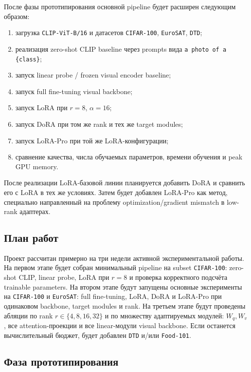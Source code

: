 \documentclass[]{scrartcl}
\begin{document}
После фазы прототипирования основной pipeline будет расширен следующим образом:
\begin{enumerate}
    \item загрузка \texttt{CLIP-ViT-B/16} и датасетов \texttt{CIFAR-100}, \texttt{EuroSAT}, \texttt{DTD};
    \item реализация zero-shot CLIP baseline через prompts вида \texttt{a photo of a \{class\}};
    \item запуск linear probe / frozen visual encoder baseline;
    \item запуск full fine-tuning visual backbone;
    \item запуск LoRA при $r=8$, $\alpha=16$;
    \item запуск DoRA при том же rank и тех же target modules;
    \item запуск LoRA-Pro при той же LoRA-конфигурации;
    \item сравнение качества, числа обучаемых параметров, времени обучения и peak GPU memory.
\end{enumerate}


После реализации LoRA-базовой линии планируется добавить DoRA и сравнить его с LoRA в тех же
условиях. Затем будет добавлен LoRA-Pro как метод, специально направленный на проблему
optimization/gradient mismatch в low-rank адаптерах.

\subsection{План работ}

Проект рассчитан примерно на три недели активной экспериментальной работы. На первом этапе будет собран минимальный pipeline на subset \texttt{CIFAR-100}: zero-shot CLIP, linear probe, LoRA при $r=8$ и проверка корректного подсчёта trainable parameters. На втором этапе будут запущены основные эксперименты на \texttt{CIFAR-100} и \texttt{EuroSAT}: full fine-tuning, LoRA, DoRA и LoRA-Pro при одинаковом backbone, target modules и rank. На третьем этапе будут проведены абляции по rank $r \in \{4,8,16,32\}$ и по множеству адаптируемых модулей: $W_q,W_v$, все attention-проекции и все linear-модули visual backbone. Если останется вычислительный бюджет, будет добавлен \texttt{DTD} и/или \texttt{Food-101}.

\subsection{Фаза прототипирования}
\end{document}
